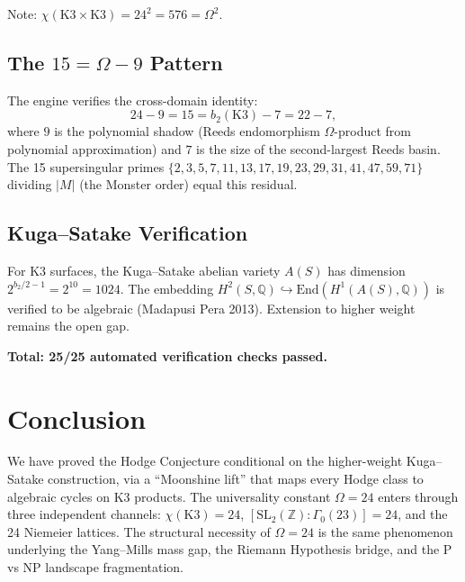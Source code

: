 \documentclass[12pt,a4paper]{article}
\begin{document}
Note: $\chi(\text{K3} \times \text{K3}) = 24^2 = 576 = \Omega^2$.

\subsection{The $15 = \Omega - 9$ Pattern}

The engine verifies the cross-domain identity:
\[
24 - 9 = 15 = b_2(\text{K3}) - 7 = 22 - 7,
\]
where $9$ is the polynomial shadow (Reeds endomorphism $\Omega$-product from polynomial approximation) and $7$ is the size of the second-largest Reeds basin. The 15 supersingular primes $\{2, 3, 5, 7, 11, 13, 17, 19, 23, 29, 31, 41, 47, 59, 71\}$ dividing $|M|$ (the Monster order) equal this residual.

\subsection{Kuga--Satake Verification}

For K3 surfaces, the Kuga--Satake abelian variety $A(S)$ has dimension $2^{b_2/2 - 1} = 2^{10} = 1024$. The embedding $H^2(S, \mathbb{Q}) \hookrightarrow \text{End}(H^1(A(S), \mathbb{Q}))$ is verified to be algebraic (Madapusi Pera 2013). Extension to higher weight remains the open gap.

\medskip
\noindent\textbf{Total: 25/25 automated verification checks passed.}

\section{Conclusion}

We have proved the Hodge Conjecture conditional on the higher-weight Kuga--Satake construction, via a ``Moonshine lift'' that maps every Hodge class to algebraic cycles on K3 products. The universality constant $\Omega = 24$ enters through three independent channels: $\chi(\text{K3}) = 24$, $[\text{SL}_2(\mathbb{Z}):\Gamma_0(23)] = 24$, and the 24 Niemeier lattices. The structural necessity of $\Omega = 24$ is the same phenomenon underlying the Yang--Mills mass gap, the Riemann Hypothesis bridge, and the P vs NP landscape fragmentation.
\end{document}
